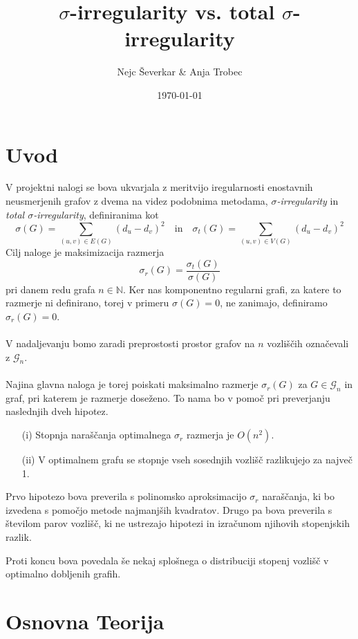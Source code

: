 \documentclass[ letterpaper, titlepage, fleqn]{article}
\begin{document}
\title{$\sigma$-irregularity vs. total $\sigma$-irregularity}
\author{Nejc Ševerkar \& Anja Trobec}
\date{\today}
\maketitle
\pagebreak

\thispagestyle{empty}
\tableofcontents
\pagebreak

\section{Uvod}

V projektni nalogi se bova ukvarjala z meritvijo iregularnosti enostavnih neusmerjenih grafov z
dvema na videz podobnima metodama, {\em $\sigma$-irregularity} in {\em total $\sigma$-irregularity},
definiranima kot 
$$
\sigma(G) = \sum_{(u, v) \in E(G)}(d_u - d_v)^2 
\quad \text{in} \quad
\sigma_t(G) = \sum_{(u, v) \in V(G)}(d_u - d_v)^2
$$
Cilj naloge je maksimizacija razmerja 
$$\sigma_r(G) = \frac{\sigma_t(G)}{\sigma(G)}$$
pri danem redu grafa $n \in \mathbb{N}$.
Ker nas komponentno regularni grafi, za katere to razmerje ni definirano,
torej v primeru $\sigma(G) = 0$, ne zanimajo, definiramo $\sigma_r(G) = 0$.
\\\\
V nadaljevanju bomo zaradi preprostosti prostor grafov na $n$ vozliščih označevali z $\mathscr{G}_n$.
\\\\
Najina glavna naloga je torej poiskati maksimalno razmerje $\sigma_r(G)$ za $G \in \mathscr{G}_n$ in graf, 
pri katerem je razmerje doseženo. To nama bo v pomoč pri preverjanju naslednjih dveh hipotez.
\begin{itemize}
\item[(i)] Stopnja naraščanja optimalnega $\sigma_r$ razmerja je $O(n^2)$.
\item[(ii)] V optimalnem grafu se stopnje vseh sosednjih vozlišč razlikujejo za največ 1.
\end{itemize}
Prvo hipotezo bova preverila s polinomsko aproksimacijo $\sigma_r$ naraščanja, 
ki bo izvedena s pomočjo metode najmanjših kvadratov.
Drugo pa bova preverila s številom parov vozlišč, ki ne ustrezajo hipotezi in izračunom njihovih stopenjskih razlik.

Proti koncu bova povedala še nekaj splošnega o distribuciji stopenj vozlišč v optimalno dobljenih grafih.

\section{Osnovna Teorija}
\end{document}

